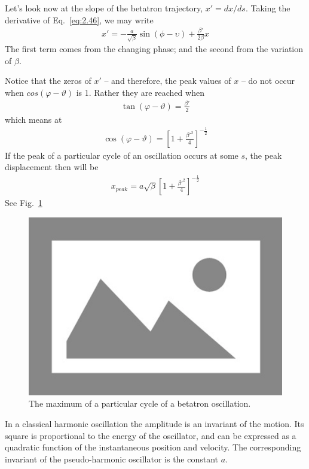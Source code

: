 Let's look now at the slope of the betatron trajectory, $x' = dx/ds$. Taking the derivative of Eq.~\eqref{eq:2.46}, we may write
\begin{align}
	x' = - \frac{a}{\sqrt{\beta}}\sin(\phi-\upsilon)+\frac{\beta'}{2\beta}x\label{eq:2.52}
\end{align}
The first term comes from the changing phase; and the second from the variation of $\beta$.

Notice that the zeros of $x'$ -- and therefore, the peak values of $x$ -- do not occur when $cos(\varphi - \vartheta)$ is 1. Rather they are reached when
\begin{align}
	\tan(\varphi-\vartheta) = \frac{\beta'}{2}
\end{align}
which means at
\begin{align}
	\cos(\varphi-\vartheta) = \left[1+\frac{\beta'^2}{4}\right]^{-\frac{1}{2}}
\end{align}
If the peak of a particular cycle of an oscillation occurs at some $s$, the peak displacement then will be
\begin{align}
	x_{peak} = a\sqrt{\beta}\left[1+\frac{\beta'^2}{4}\right]^{-\frac{1}{2}}
\end{align}
See Fig.~\ref{fig:fig13}

\begin{figure}[!htb]
	\centering
	\includegraphics[width=0.8\linewidth]{./Figuras/placeholder.png}
	\caption{The maximum of a particular cycle of a betatron oscillation.}
	\label{fig:fig13}
\end{figure}

In a classical harmonic oscillation the amplitude is an invariant of the motion. Its square is proportional to the energy of the oscillator, and can be expressed as a quadratic function of the instantaneous position and velocity. The corresponding invariant of the pseudo-harmonic oscillator is the constant $a$.

